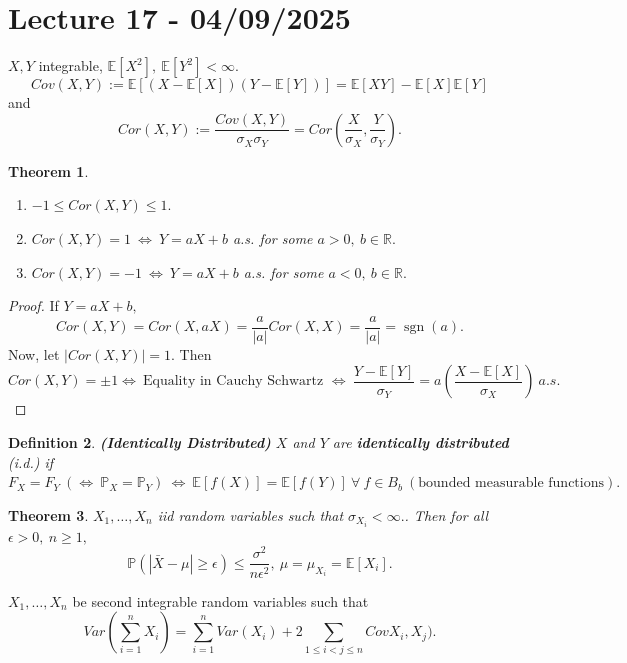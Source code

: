 \documentclass{article}
\DeclareMathOperator{\sgn}{sgn}
\newcommand{\1}{\mathds{1}}
\newcommand{\R}{\mathbb{R}}
\newcommand{\E}{\mathbb{E}}
\newcommand{\PB}{\mathbb{P}}
\newcommand{\lf}{\left}
\newcommand{\rg}{\right}
\newcommand{\f}[2]{\frac{#1}{#2}}
\newcommand{\fb}[1]{\lf(#1\rg)}
\newcommand{\card}[1]{\lf\vert #1\rg\vert}
\newtheorem{theorem}{Theorem}[section]
\newtheorem{definition}[theorem]{Definition}
\begin{document}
\section{Lecture 17 - 04/09/2025}
$X,Y$ integrable, $\E[X^2],\ \E[Y^2]<\infty.$
$$Cov(X,Y):=\E[(X-\E[X])(Y-\E[Y])]=\E[XY]-\E[X]\E[Y]$$ and $$Cor(X,Y):=\f{Cov(X,Y)}{\sigma_X\sigma_Y}=Cor\fb{\f X{\sigma_X},\f Y{\sigma_Y}}.$$
\begin{theorem}
    \begin{enumerate}
        \item $-1\leq Cor(X,Y)\leq 1.$
        \item $Cor(X,Y)=1\ \iff\ Y=aX+b$ a.s. for some $a>0,\ b\in\R.$
        \item $Cor(X,Y)=-1\ \iff\ Y=aX+b$ a.s. for some $a<0,\ b\in\R.$
    \end{enumerate}
\end{theorem}
\begin{proof}
    If $Y=aX+b,$ $$Cor(X,Y)=Cor(X,aX)=\f a{\card{a}}Cor(X,X)=\f a{\card{a}}=\sgn(a).$$ Now, let $\card{Cor(X,Y)}=1.$ Then $$Cor(X,Y)=\pm 1\iff\ \text{Equality in Cauchy Schwartz }\iff\ \f{Y-\E[Y]}{\sigma_Y}=a\fb{\f{X-\E[X]}{\sigma_X}}\ a.s.$$
\end{proof}
\begin{definition}\textbf{(Identically Distributed)}
    $X$ and $Y$ are \textbf{identically distributed} (i.d.) if $F_X=F_Y\ (\iff\ \PB_X=\PB_Y)\ \iff\ \E[f(X)]=\E[f(Y)]\ \forall\ f\in B_b\ (\text{bounded measurable functions}).$ 
\end{definition}
\begin{theorem}
  $X_1,\ldots,X_n$ iid random variables such that $\sigma_{X_i}<\infty.$. Then for all $\epsilon>0,\ n\geq 1,$ $$\PB\fb{\card{\bar{X}-\mu}\geq\epsilon}\leq\f{\sigma^2}{n\epsilon^2},\ \mu=\mu_{X_i}=\E[X_i].$$  
\end{theorem}

$X_1,\ldots, X_n$ be second integrable random variables such that $$Var\fb{\sum_{i=1}^n X_i}=\sum_{i=1}^n Var(X_i)+2\sum_{1\leq i<j\leq n}CovX_i,X_j).$$
\end{document}
